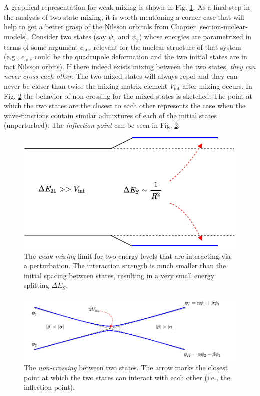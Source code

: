 A graphical representation for weak mixing is shown in Fig. \ref{weak-mixing-fig}. As a final step in the analysis of two-state mixing, it is worth mentioning a corner-case that will help to get a better grasp of the Nilsson orbitals from Chapter \ref{section-nuclear-models}. Consider two states (say $\psi_1$ and $\psi_2$) whose energies are parametrized in terms of some argument $c_\text{nuc}$ relevant for the nuclear structure of that system (e.g., $c_\text{nuc}$ could be the quadrupole deformation and the two initial states are in fact Nilsson orbits). If there indeed exists mixing between the two states, \emph{they can never cross each other}. The two mixed states will always repel and they can never be closer than twice the mixing matrix element $V_\text{int}$ after mixing occurs. In Fig. \ref{fig-non-crossing} the behavior of non-crossing for the mixed states is sketched. The point at which the two states are the closest to each other represents the case when the wave-functions contain similar admixtures of each of the initial states (unperturbed). The \emph{inflection point} can be seen in Fig. \ref{fig-non-crossing}.
\begin{figure}
    \centering
    \includegraphics[scale=0.95]{Chapters/Figures/mixing_weak_coupling.pdf}
    \caption{The \emph{weak mixing} limit for two energy levels that are interacting via a perturbation. The interaction strength is much smaller than the initial spacing between states, resulting in a very small energy splitting $\Delta E_{S}$.}
    \label{weak-mixing-fig}
\end{figure}
\begin{figure}
    \centering
    \includegraphics[scale=0.9]{Chapters/Figures/state_non_crossing.pdf}
    \caption{The \emph{non-crossing} between two states. The arrow marks the closest point at which the two states can interact with each other (i.e., the inflection point).}
    \label{fig-non-crossing}
\end{figure}
